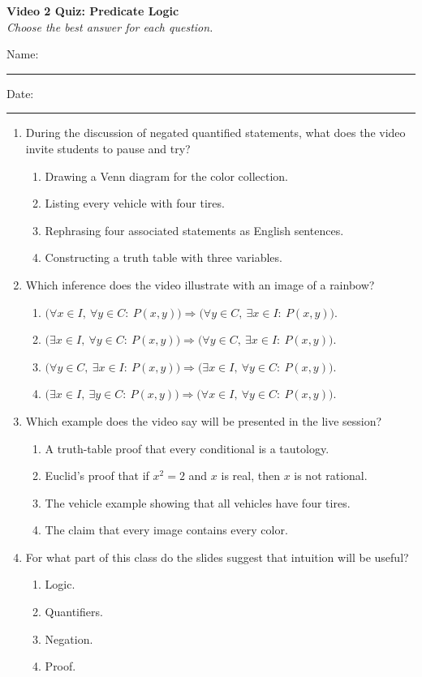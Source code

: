 \documentclass[10pt]{article}
\begin{document}
\begin{center}
  {\large\bfseries Video 2 Quiz: Predicate Logic}\\[0.25em]
  \textit{Choose the best answer for each question.}
\end{center}
\noindent Name:\ \rule{3.2in}{0.4pt}\hfill Date:\ \rule{1.25in}{0.4pt}
\vspace{0.7em}
\begin{enumerate}
  \item During the discussion of negated quantified statements, what does the video invite students to pause and try?
  \begin{enumerate}
    \item Drawing a Venn diagram for the color collection.
    \item Listing every vehicle with four tires.
    \item Rephrasing four associated statements as English sentences.
    \item Constructing a truth table with three variables.
  \end{enumerate}

  \item Which inference does the video illustrate with an image of a rainbow?
  \begin{enumerate}
    \item $\bigl(\forall x\in I,\ \forall y\in C:\ P(x,y)\bigr)\Rightarrow\bigl(\forall y\in C,\ \exists x\in I:\ P(x,y)\bigr)$.
    \item $\bigl(\exists x\in I,\ \forall y\in C:\ P(x,y)\bigr)\Rightarrow\bigl(\forall y\in C,\ \exists x\in I:\ P(x,y)\bigr)$.
    \item $\bigl(\forall y\in C,\ \exists x\in I:\ P(x,y)\bigr)\Rightarrow\bigl(\exists x\in I,\ \forall y\in C:\ P(x,y)\bigr)$.
    \item $\bigl(\exists x\in I,\ \exists y\in C:\ P(x,y)\bigr)\Rightarrow\bigl(\forall x\in I,\ \forall y\in C:\ P(x,y)\bigr)$.
  \end{enumerate}

  \item Which example does the video say will be presented in the live session?
  \begin{enumerate}
    \item A truth-table proof that every conditional is a tautology.
    \item Euclid's proof that if $x^2=2$ and $x$ is real, then $x$ is not rational.
    \item The vehicle example showing that all vehicles have four tires.
    \item The claim that every image contains every color.
  \end{enumerate}

  \item For what part of this class do the slides suggest that intuition will be useful?
  \begin{enumerate}
    \item Logic.
    \item Quantifiers.
    \item Negation.
    \item Proof.
  \end{enumerate}
\end{enumerate}
\end{document}
